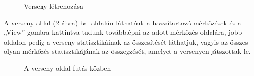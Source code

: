 \begin{figure}[h]
\centering
{}
\caption{Verseny létrehozása}
\label{fig:newTournamentTest}
\end{figure}

A verseny oldal (\ref{fig:tournamentTest} ábra) bal oldalán láthatóak a hozzátartozó mérkőzések és a „View” gombra kattintva tudunk továbblépni az adott mérkőzés oldalára, jobb oldalon pedig a verseny statisztikáinak az összesítését láthatjuk, vagyis az összes olyan mérkőzés statisztikájának az összegzését, amelyet a versenyen játszottak le.

\begin{figure}[h]
\centering
{}
\caption{A verseny oldal futás közben}
\label{fig:tournamentTest}
\end{figure}

